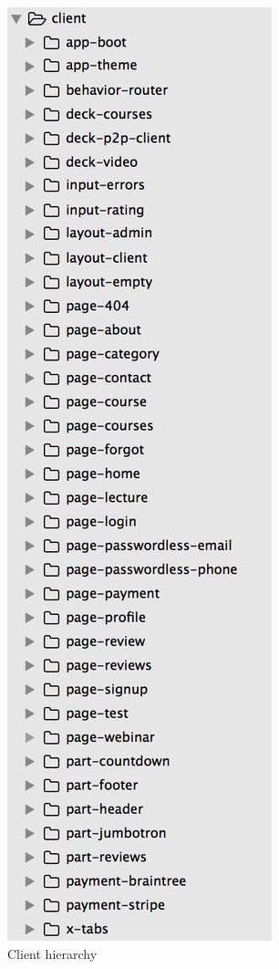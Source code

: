 \begin{figure}[htbp] %
 \centering
 \includegraphics[width=0.5\linewidth]{images/chapter3/client.png}\hfill
 \caption[Client hierarchy]{Client hierarchy}
 \label{fig:fourV}
\end{figure}

\newpage